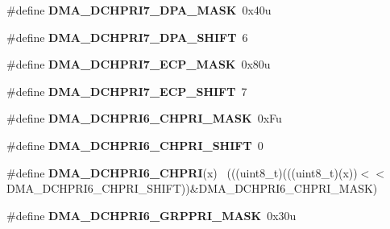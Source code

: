 \begin{DoxyCompactItemize}
\item 
\hypertarget{group___d_m_a___register___masks_gab10ff916f8dfc06df312689bd2dd36f5}{}\#define {\bfseries D\+M\+A\+\_\+\+D\+C\+H\+P\+R\+I7\+\_\+\+D\+P\+A\+\_\+\+M\+A\+S\+K}~0x40u\label{group___d_m_a___register___masks_gab10ff916f8dfc06df312689bd2dd36f5}

\item 
\hypertarget{group___d_m_a___register___masks_ga531216c2edb80108b8c4cd13883aef06}{}\#define {\bfseries D\+M\+A\+\_\+\+D\+C\+H\+P\+R\+I7\+\_\+\+D\+P\+A\+\_\+\+S\+H\+I\+F\+T}~6\label{group___d_m_a___register___masks_ga531216c2edb80108b8c4cd13883aef06}

\item 
\hypertarget{group___d_m_a___register___masks_ga544768122b9d6cea0945411c14c5f79f}{}\#define {\bfseries D\+M\+A\+\_\+\+D\+C\+H\+P\+R\+I7\+\_\+\+E\+C\+P\+\_\+\+M\+A\+S\+K}~0x80u\label{group___d_m_a___register___masks_ga544768122b9d6cea0945411c14c5f79f}

\item 
\hypertarget{group___d_m_a___register___masks_gad2c636360eb68d654d17b99db5d849d6}{}\#define {\bfseries D\+M\+A\+\_\+\+D\+C\+H\+P\+R\+I7\+\_\+\+E\+C\+P\+\_\+\+S\+H\+I\+F\+T}~7\label{group___d_m_a___register___masks_gad2c636360eb68d654d17b99db5d849d6}

\item 
\hypertarget{group___d_m_a___register___masks_ga30dc9b09d09c54838004e9c23a16c6b7}{}\#define {\bfseries D\+M\+A\+\_\+\+D\+C\+H\+P\+R\+I6\+\_\+\+C\+H\+P\+R\+I\+\_\+\+M\+A\+S\+K}~0x\+Fu\label{group___d_m_a___register___masks_ga30dc9b09d09c54838004e9c23a16c6b7}

\item 
\hypertarget{group___d_m_a___register___masks_gac12a93574812e9019f2e7dc31e844205}{}\#define {\bfseries D\+M\+A\+\_\+\+D\+C\+H\+P\+R\+I6\+\_\+\+C\+H\+P\+R\+I\+\_\+\+S\+H\+I\+F\+T}~0\label{group___d_m_a___register___masks_gac12a93574812e9019f2e7dc31e844205}

\item 
\hypertarget{group___d_m_a___register___masks_gae084236b29d8141f37d4b6aa28575d5f}{}\#define {\bfseries D\+M\+A\+\_\+\+D\+C\+H\+P\+R\+I6\+\_\+\+C\+H\+P\+R\+I}(x)                                      ~(((uint8\+\_\+t)(((uint8\+\_\+t)(x))$<$$<$D\+M\+A\+\_\+\+D\+C\+H\+P\+R\+I6\+\_\+\+C\+H\+P\+R\+I\+\_\+\+S\+H\+I\+F\+T))\&D\+M\+A\+\_\+\+D\+C\+H\+P\+R\+I6\+\_\+\+C\+H\+P\+R\+I\+\_\+\+M\+A\+S\+K)\label{group___d_m_a___register___masks_gae084236b29d8141f37d4b6aa28575d5f}

\item 
\hypertarget{group___d_m_a___register___masks_gab2d779105f37687b3223a0b9b356f7ad}{}\#define {\bfseries D\+M\+A\+\_\+\+D\+C\+H\+P\+R\+I6\+\_\+\+G\+R\+P\+P\+R\+I\+\_\+\+M\+A\+S\+K}~0x30u\label{group___d_m_a___register___masks_gab2d779105f37687b3223a0b9b356f7ad}


\end{DoxyCompactItemize}

